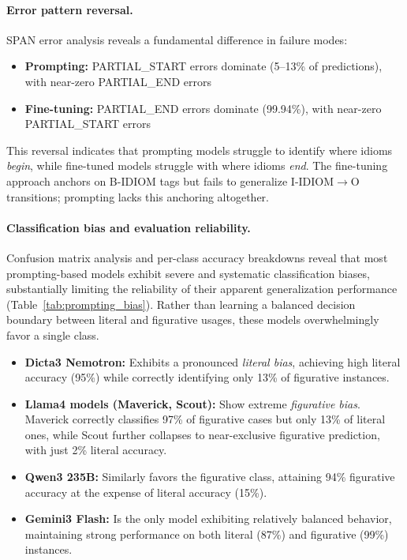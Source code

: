 \documentclass[11pt]{article}
\begin{document}
\paragraph{Error pattern reversal.}
SPAN error analysis reveals a fundamental difference in failure modes:
\begin{itemize}
    \item \textbf{Prompting:} PARTIAL\_START errors dominate (5--13\% of predictions), with near-zero PARTIAL\_END errors
    \item \textbf{Fine-tuning:} PARTIAL\_END errors dominate (99.94\%), with near-zero PARTIAL\_START errors
\end{itemize}
This reversal indicates that prompting models struggle to identify where idioms \textit{begin}, while fine-tuned models struggle with where idioms \textit{end}. The fine-tuning approach anchors on B-IDIOM tags but fails to generalize I-IDIOM$\rightarrow$O transitions; prompting lacks this anchoring altogether.

\paragraph{Classification bias and evaluation reliability.}
Confusion matrix analysis and per-class accuracy breakdowns reveal that most prompting-based models exhibit severe and systematic classification biases, substantially limiting the reliability of their apparent generalization performance (Table~\ref{tab:prompting_bias}).
Rather than learning a balanced decision boundary between literal and figurative usages, these models overwhelmingly favor a single class.

\begin{itemize}
    \item \textbf{Dicta3 Nemotron:} Exhibits a pronounced \emph{literal bias}, achieving high literal accuracy (95\%) while correctly identifying only 13\% of figurative instances.
    \item \textbf{Llama4 models (Maverick, Scout):} Show extreme \emph{figurative bias}. Maverick correctly classifies 97\% of figurative cases but only 13\% of literal ones, while Scout further collapses to near-exclusive figurative prediction, with just 2\% literal accuracy.
    \item \textbf{Qwen3 235B:} Similarly favors the figurative class, attaining 94\% figurative accuracy at the expense of literal accuracy (15\%).
    \item \textbf{Gemini3 Flash:} Is the only model exhibiting relatively balanced behavior, maintaining strong performance on both literal (87\%) and figurative (99\%) instances.
\end{itemize}
\end{document}
